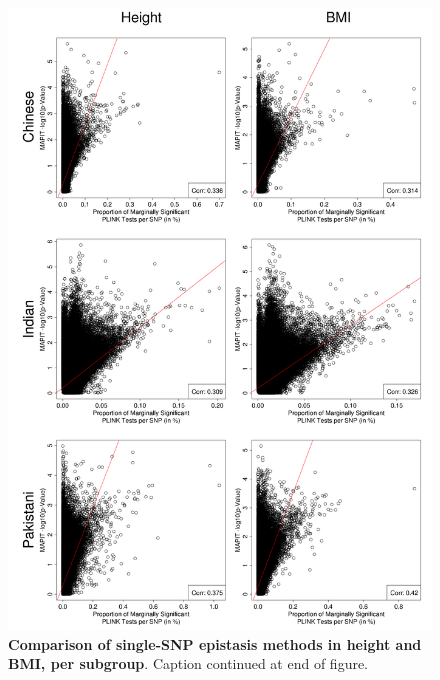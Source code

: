 \documentclass[12pt,a4paper]{article}
\begin{document}
\setlength{\footskip}{3cm}
\begin{figure}[htbp]
\centering
\vspace*{-2cm}
\includegraphics[scale=.3]{Images/Supp/InterPath_Supp_Figure_PLINKvsMAPIT_vs3_AllPops_HeightBMI_pt2.png}
\caption[TBD]{\textbf{Comparison of single-SNP epistasis methods in height and BMI, per subgroup}. Caption continued at end of figure.}
\label{InterPath-Supp-Figure-MAPITvsPLINK-HeightBMI-AllPops-b}
\end{figure}
\clearpage
\setlength{\footskip}{1cm}
\addtocounter{figure}{-1}
\end{document}
